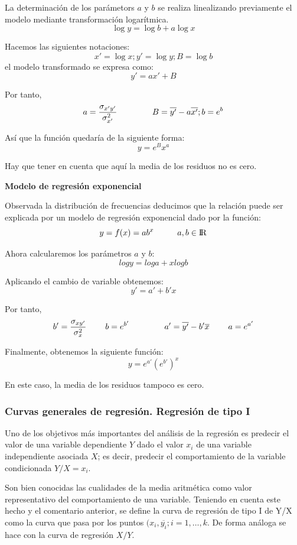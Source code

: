 \documentclass[10pt, a4paper]{article}
\theoremstyle{theorem-style}
\theoremstyle{definition-style}
\theoremstyle{remark-style}
\theoremstyle{example-style}
\theoremstyle{definition-style}
\theoremstyle{remark-style}
\begin{document}
La determinación de los parámetors $a$ y $b$ se realiza linealizando previamente el
modelo mediante transformación logarítmica.
$$ \log y = \log b + a\log x $$

	Hacemos las siguientes notaciones: $$x' = \log x; y' = \log y ; B = \log b $$
	el modelo transformado se expresa como: $$y' = ax' + B $$

	Por tanto,
	$$ a = \frac{\sigma_{x'y'} }{\sigma_{x'}^2} \hspace{1.5cm} B = \overline{y'} - a\overline{x'} ; b = e^{b} $$

  Así que la función quedaría de la siguiente forma:
	$$ y = e^{B}x^{a} $$

	Hay que tener en cuenta que aquí la media de los residuos no es cero.

\vspace{5mm}
\textbf{Modelo de regresión exponencial}

Observada la distribución de frecuencias deducimos que la relación puede ser explicada por un modelo de regresión exponencial dado por la función:
  $$ y = f(x) = ab^{x} \hspace{1cm}a,b \in \rm I\!R $$

	Ahora calcularemos los parámetros $a$ y $b$:
	$$ log y = log a + xlog b $$

	Aplicando el cambio de variable obtenemos:
	$$ y' = a' + b'x $$

	Por tanto,
	$$ b' = \frac{\sigma_{xy'} }{\sigma_{x}^2} \hspace{0.8cm}  b = e^{b'} \hspace{1.5cm} a' = \overline{y'} - b'\overline{x} \hspace{0.8cm}  a = e^{a'} $$

	Finalmente, obtenemos la siguiente función:
	$$ y = e^{a'}(e^{b'})^{x} $$

	En este caso, la media de los residuos tampoco es cero.
	
\subsubsection{Curvas generales de regresión. Regresión de tipo I}

Uno de los objetivos más importantes del análisis de la regresión es predecir el
valor de una variable dependiente $Y$ dado el valor $x_i$ de una variable
independiente asociada $X$; es decir, predecir el comportamiento de la variable
condicionada $Y/X = x_i$.

Son bien conocidas las cualidades de la media aritmética como valor
representativo del comportamiento de una variable. Teniendo en cuenta este hecho
y el comentario anterior, se define la curva de regresión de tipo I de Y/X como
la curva que pasa por los puntos $(x_i,\overline{y_i}; i = 1,\ldots,k $.
De forma análoga se hace con la curva de regresión $X/Y$.
\end{document}
